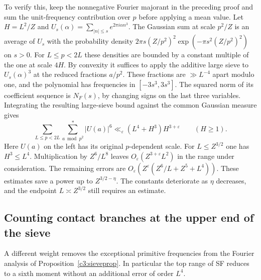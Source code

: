 \documentclass[11pt,letterpaper]{article}
\theoremstyle{definition}
\begin{document}
To verify this, keep the nonnegative Fourier majorant in the preceding
proof and sum the unit-frequency contribution over $p$ before applying
a mean value. Let $H=L^2/Z$ and
$U_s(\alpha)=\sum_{|n|\le s}e^{2\pi i\alpha n^3}$. The Gaussian sum
at scale $p^2/Z$ is an average of $U_s$ with the probability density
$2\pi s(Z/p^2)^2\exp(-\pi s^2(Z/p^2)^2)$ on $s>0$. For $L\le p<2L$
these densities are bounded by a constant multiple of the one at scale
$4H$. By convexity it suffices to apply the additive large sieve to
$U_s(\alpha)^3$ at the reduced fractions $a/p^2$. These fractions are
$\gg L^{-4}$ apart modulo one, and the polynomial has frequencies
in $[-3s^3,3s^3]$. The squared norm of its coefficient sequence is
$N_F(s)$, by changing signs on the last three variables. Integrating the
resulting large-sieve bound against the common Gaussian measure gives
\[
 \sum_{L\le p<2L}\sum_{a\bmod p^2}^*
       |U(a)|^6\ll_\varepsilon (L^4+H^3)H^{3+\varepsilon}
       \qquad(H\ge1).
\]
Here $U(a)$ on the left has its original $p$-dependent scale.
For $L\le Z^{3/2}$ one has $H^3\le L^4$. Multiplication by
$Z^6/L^8$ leaves $O_\varepsilon(Z^{3+\varepsilon}L^2)$ in the
range under consideration. The remaining errors are
$O_\varepsilon(Z^\varepsilon(Z^6/L+Z^5+L^4))$. These estimates save
a power up to $Z^{3/2-\eta}$. The constants deteriorate as $\eta$
decreases, and the endpoint $L\asymp Z^{3/2}$ still requires an estimate.

\subsection{Counting contact branches at the upper end of the sieve}
A different weight removes the exceptional primitive frequencies from
the Fourier analysis of Proposition~\ref{c3:sieveprop}. In particular
the top range of SF reduces to a sixth moment without an additional
error of order $L^4$.
\end{document}
